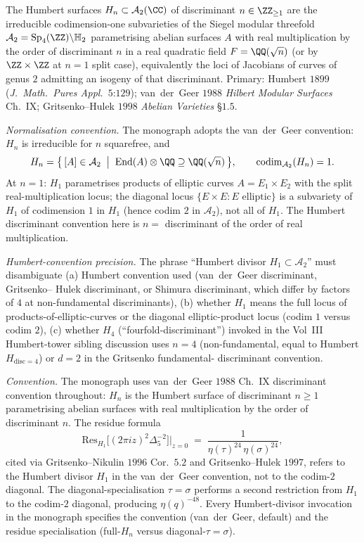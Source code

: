 \begin{theorem}
\label{wn:thm:third-pass-Humbert}

The Humbert surfaces $H_n \subset \mathcal{A}_2(\CC)$ of discriminant
$n \in \ZZ_{\geq 1}$ are the irreducible codimension-one subvarieties
of the Siegel modular threefold $\mathcal{A}_2 =
\mathrm{Sp}_4(\ZZ)\backslash\mathbb{H}_2$ parametrising abelian
surfaces $A$ with real multiplication by the order of discriminant
$n$ in a real quadratic field $F = \QQ(\sqrt{n})$ (or by
$\ZZ \times \ZZ$ at $n = 1$ split case), equivalently the loci of
Jacobians of curves of genus $2$ admitting an isogeny of that
discriminant. Primary: Humbert $1899$ (\emph{J.~Math.~Pures
Appl.}~$5$:$129$); van~der~Geer $1988$ \emph{Hilbert Modular
Surfaces} Ch.~IX; Gritsenko--Hulek $1998$ \emph{Abelian Varieties}
\S$1.5$.

\emph{Normalisation convention.} The monograph adopts the
van~der~Geer convention: $H_n$ is irreducible for $n$
squarefree, and
\[
H_n = \bigl\{\,[A] \in \mathcal{A}_2 \;\bigm|\;
\mathrm{End}(A)\otimes\QQ \supseteq \QQ(\sqrt{n})\,\bigr\},
\qquad
\mathrm{codim}_{\mathcal{A}_2}(H_n) = 1.
\]
At $n = 1$: $H_1$ parametrises products of elliptic curves
$A = E_1 \times E_2$ with the split real-multiplication locus; the
diagonal locus $\{E \times E : E \text{ elliptic}\}$ is a
subvariety of $H_1$ of codimension $1$ in $H_1$ (hence codim $2$ in
$\mathcal{A}_2$), not all of $H_1$. The Humbert discriminant
convention here is $n = $ discriminant of the order of real
multiplication.

\emph{Humbert-convention precision.} The phrase
``Humbert divisor $H_1 \subset \mathcal{A}_2$'' must disambiguate
(a) Humbert convention used (van~der~Geer discriminant, Gritsenko--
Hulek discriminant, or Shimura discriminant, which differ by
factors of $4$ at non-fundamental discriminants), (b) whether $H_1$
means the full locus of products-of-elliptic-curves or the diagonal
elliptic-product locus (codim $1$ versus codim $2$), (c) whether $H_4$
(``fourfold-discriminant'') invoked in the Vol~III Humbert-tower
sibling discussion uses $n = 4$ (non-fundamental, equal to Humbert
$H_{\mathrm{disc = 4}}$) or $d = 2$ in the Gritsenko fundamental-
discriminant convention.

\emph{Convention.} The monograph uses van~der~Geer $1988$ Ch.~IX
discriminant convention throughout: $H_n$ is the Humbert surface of
discriminant $n \geq 1$ parametrising abelian surfaces with real
multiplication by the order of discriminant $n$. The residue
formula
\[
\mathrm{Res}_{H_1}\bigl[(2\pi i z)^2 \Delta_5^{-2}\bigr]\Big|_{z = 0}
\;=\; \frac{1}{\eta(\tau)^{24}\,\eta(\sigma)^{24}},
\]
cited via Gritsenko--Nikulin $1996$ Cor.~$5.2$ and
Gritsenko--Hulek $1997$, refers to the Humbert divisor $H_1$ in the
van~der~Geer convention, not to the codim-$2$ diagonal. The
diagonal-specialisation $\tau = \sigma$ performs a second restriction
from $H_1$ to the codim-$2$ diagonal, producing $\eta(q)^{-48}$. Every
Humbert-divisor invocation in the monograph specifies the convention
(van~der~Geer, default) and the residue specialisation (full-$H_n$
versus diagonal-$\tau = \sigma$).


\end{theorem}
